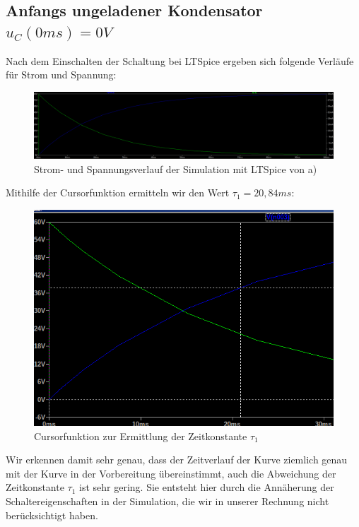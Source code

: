 \documentclass{article}
\begin{document}
\subsection{Anfangs ungeladener Kondensator $u_C(0ms)=0V$}
\label{sec:anfangs-ungel-kond}


Nach dem Einschalten der Schaltung bei LTSpice ergeben sich folgende Verläufe für Strom und Spannung:

\begin{figure}[h]
  \begin{center}
  \includegraphics[scale=0.32]{../assets/images/ET2P5/StromSpannung11.png}
  \caption{Strom- und Spannungsverlauf der Simulation mit LTSpice von a)}
\end{center}
\end{figure}
\newpage



Mithilfe der Cursorfunktion ermitteln wir den Wert $\tau_{1} = 20,84ms$:

\begin{figure}[h]
  \centering
  \includegraphics[scale=0.5]{../assets/images/ET2P5/Zeitkonstante11.png}
  \caption{Cursorfunktion zur Ermittlung der Zeitkonstante $\tau_1$}
  \label{fig:cont11}
\end{figure}

Wir erkennen damit sehr genau, dass der Zeitverlauf der Kurve ziemlich genau mit der Kurve in der Vorbereitung übereinstimmt, auch die Abweichung der Zeitkonstante $\tau_{1}$ ist sehr gering. Sie entsteht hier durch die Annäherung der Schaltereigenschaften in der Simulation, die wir in unserer Rechnung nicht berücksichtigt haben.
\end{document}
